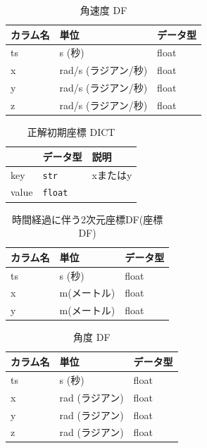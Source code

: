 \begin{table}[ht]
	\caption{角速度 DF}
	\centering
	\begin{tabular}{lll}
		\toprule
		カラム名 & 単位             & データ型  \\
		\midrule
		ts   & s (秒)          & float \\
		x    & rad/s (ラジアン/秒) & float \\
		y    & rad/s (ラジアン/秒) & float \\
		z    & rad/s (ラジアン/秒) & float \\
		\bottomrule
	\end{tabular}
\end{table}


\begin{table}[ht]
	\caption{正解初期座標 DICT}
	\centering
	\label{tab:first-coord-dict}
	\begin{tabular}{lll}
		\hline
		      & {データ型}         & {説明}          \\ \hline
		key   & \texttt{str}   & xまたはy         \\ \hline
		value & \texttt{float} & \makecell{座標} \\ \hline
	\end{tabular}
\end{table}


\begin{table}[ht]
  \caption{時間経過に伴う2次元座標DF(座標DF)}
	\centering
	\begin{tabular}{lll}
		\toprule
		カラム名 & 単位      & データ型  \\
		\midrule
		ts   & s (秒)   & float \\
		x    & m(メートル) & float \\
		y    & m(メートル) & float \\
		\bottomrule
	\end{tabular}
\end{table}


\begin{table}[ht]
  \caption{角度 DF}
	\centering
	\begin{tabular}{lll}
		\toprule
		カラム名 & 単位         & データ型  \\
		\midrule
		ts   & s (秒)      & float \\
		x    & rad (ラジアン) & float \\
		y    & rad (ラジアン) & float \\
		z    & rad (ラジアン) & float \\
		\bottomrule
	\end{tabular}
\end{table}


